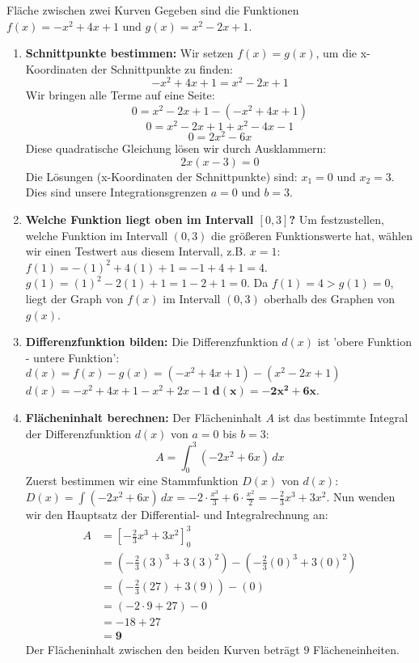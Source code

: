 \begin{loesungsumgebung}{Fläche zwischen zwei Kurven}
Gegeben sind die Funktionen $f(x) = -x^2 + 4x + 1$ und $g(x) = x^2 - 2x + 1$.

\begin{enumerate}[label=(\alph*)]
    \item \textbf{Schnittpunkte bestimmen:}
    Wir setzen $f(x) = g(x)$, um die x-Koordinaten der Schnittpunkte zu finden:
    $$ -x^2 + 4x + 1 = x^2 - 2x + 1 $$
    Wir bringen alle Terme auf eine Seite:
    $$ 0 = x^2 - 2x + 1 - (-x^2 + 4x + 1) $$
    $$ 0 = x^2 - 2x + 1 + x^2 - 4x - 1 $$
    $$ 0 = 2x^2 - 6x $$
    Diese quadratische Gleichung lösen wir durch Ausklammern:
    $$ 2x(x-3) = 0 $$
    Die Lösungen (x-Koordinaten der Schnittpunkte) sind:
    $x_1 = 0$ und $x_2 = 3$.
    Dies sind unsere Integrationsgrenzen $a=0$ und $b=3$.

    \item \textbf{Welche Funktion liegt oben im Intervall $[0,3]$?}
    Um festzustellen, welche Funktion im Intervall $(0,3)$ die größeren Funktionswerte hat, wählen wir einen Testwert aus diesem Intervall, z.B. $x=1$:
    $f(1) = -(1)^2 + 4(1) + 1 = -1 + 4 + 1 = 4$.
    $g(1) = (1)^2 - 2(1) + 1 = 1 - 2 + 1 = 0$.
    Da $f(1) = 4 > g(1) = 0$, liegt der Graph von $f(x)$ im Intervall $(0,3)$ oberhalb des Graphen von $g(x)$.

    \item \textbf{Differenzfunktion bilden:}
    Die Differenzfunktion $d(x)$ ist 'obere Funktion - untere Funktion':
    $d(x) = f(x) - g(x) = (-x^2 + 4x + 1) - (x^2 - 2x + 1)$
    $d(x) = -x^2 + 4x + 1 - x^2 + 2x - 1$
    $\mathbf{d(x) = -2x^2 + 6x}$.

    \item \textbf{Flächeninhalt berechnen:}
    Der Flächeninhalt $A$ ist das bestimmte Integral der Differenzfunktion $d(x)$ von $a=0$ bis $b=3$:
    $$ A = \int_0^3 (-2x^2 + 6x) \,dx $$
    Zuerst bestimmen wir eine Stammfunktion $D(x)$ von $d(x)$:
    $D(x) = \int (-2x^2 + 6x) \,dx = -2 \cdot \frac{x^3}{3} + 6 \cdot \frac{x^2}{2} = -\frac{2}{3}x^3 + 3x^2$.
    Nun wenden wir den Hauptsatz der Differential- und Integralrechnung an:
    \begin{align*}
    A &= \left[ -\frac{2}{3}x^3 + 3x^2 \right]_0^3 \\
      &= \left( -\frac{2}{3}(3)^3 + 3(3)^2 \right) - \left( -\frac{2}{3}(0)^3 + 3(0)^2 \right) \\
      &= \left( -\frac{2}{3}(27) + 3(9) \right) - (0) \\
      &= (-2 \cdot 9 + 27) - 0 \\
      &= -18 + 27 \\
      &= \mathbf{9}
    \end{align*}
    Der Flächeninhalt zwischen den beiden Kurven beträgt $9$ Flächeneinheiten.


\end{enumerate}
\end{loesungsumgebung}
